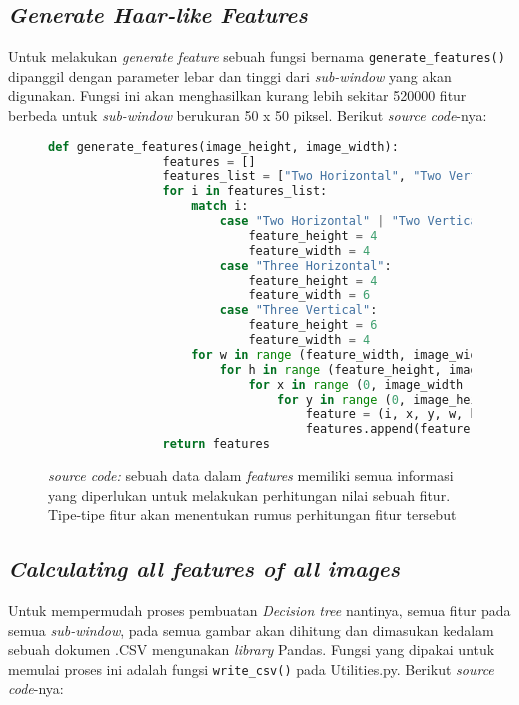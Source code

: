 \subsection{\textit{Generate Haar-like Features}}
	Untuk melakukan \emph{generate feature} sebuah fungsi bernama \texttt{generate\_features()} dipanggil 
	dengan parameter lebar dan tinggi dari \emph{sub-window} yang akan digunakan. Fungsi ini akan 
	menghasilkan kurang lebih sekitar 520000 fitur berbeda untuk \emph{sub-window} berukuran 
	50 x 50 piksel. Berikut \emph{source code}-nya:

	\begin{figure}[H]
		\begin{lstlisting}[language=Python, basicstyle=\tiny]
			def generate_features(image_height, image_width):
				features = []
				features_list = ["Two Horizontal", "Two Vertical", "Four Diagonal", "Right Triangular", "Left Triangular", "Three Horizontal", "Three Vertical"]
				for i in features_list:
					match i:
						case "Two Horizontal" | "Two Vertical" | "Four Diagonal" | "Right Triangular" | "Left Triangular":
							feature_height = 4
							feature_width = 4
						case "Three Horizontal":
							feature_height = 4
							feature_width = 6
						case "Three Vertical":
							feature_height = 6
							feature_width = 4
					for w in range (feature_width, image_width+1, feature_width):
						for h in range (feature_height, image_height+1, feature_height):
							for x in range (0, image_width - w):
								for y in range (0, image_height - h):
									feature = (i, x, y, w, h)
									features.append(feature)
    			return features
		\end{lstlisting}
		\caption{\emph{source code:} sebuah data dalam \textit{features} memiliki semua informasi yang diperlukan 
		untuk melakukan perhitungan nilai sebuah fitur. Tipe-tipe fitur akan menentukan rumus perhitungan fitur tersebut}
		\label{code:generate features}
	\end{figure}

\subsection{\textit{Calculating all features of all images}}
	Untuk mempermudah proses pembuatan \emph{Decision tree} nantinya, semua fitur 
	pada semua \textit{sub-window}, pada semua gambar akan dihitung dan dimasukan 
	kedalam sebuah dokumen .CSV mengunakan \textit{library} Pandas. Fungsi yang dipakai untuk memulai proses ini adalah 
	fungsi \texttt{write\_csv()} pada Utilities.py. Berikut \emph{source code}-nya:

